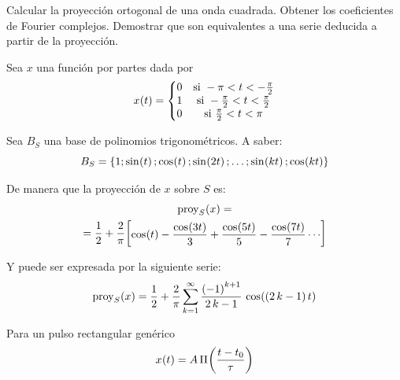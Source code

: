 \begin{mdframed}[style=ExampleFrame]
    \begin{example}
    \end{example}
    \begin{formatI}
        Calcular la proyección ortogonal de una onda cuadrada.
        Obtener los coeficientes de Fourier complejos.
        Demostrar que son equivalentes a una serie deducida a partir de la proyección.
    \end{formatI}
    \vspace{1em}
    Sea $x$ una función por partes dada por
    \[
        \fx[x]{t} =
        \left\{
        \begin{matrix}
            0 & \text{si } -\pi < t < -\frac{\pi}{2}
            \\
            1 & \text{si } -\frac{\pi}{2} < t < \frac{\pi}{2}
            \\
            0 & \text{si } \frac{\pi}{2} < t < \pi
        \end{matrix}
        \right.
    \]
    
    Sea $B_S$ una base de polinomios trigonométricos.
    A saber:
    \[
        B_S = \inBraces{1; \fx[\sin]{t}; \fx[\cos]{t}; \fx[\sin]{2t}; \dots; \fx[\sin]{\kth t}; \fx[\cos]{\kth t}}
    \]
    
    De manera que la proyección de $x$ sobre $S$ es:
    \begin{multline*}
        \fx[\proy_S]{x} =
        \\
        = \frac{1}{2} + \frac{2}{\pi} \inBrackets{\fx[\cos]{t} - \dfrac{\fx[\cos]{3t}}{3} + \dfrac{\fx[\cos]{5t}}{5} - \dfrac{\fx[\cos]{7t}}{7} \cdots}
    \end{multline*}

    Y puede ser expresada por la siguiente serie:
    \begin{equation}
        \fx[\proy_S]{x} = \frac{1}{2} + \frac{2}{\pi} \sum_{\kth=1}^\infty \frac{\inParentheses{-1}^{\kth+1}}{2 \, \kth - 1} \, \fx[\cos]{\inParentheses{2 \, \kth -1} t}
        \label{eqn:FourierProy}
    \end{equation}

    Para un pulso rectangular genérico
    \[
        \fx[x]{t} = A \, \fx[\Pi]{\frac{t-t_0}{\tau}}
    \]
    

\end{mdframed}
